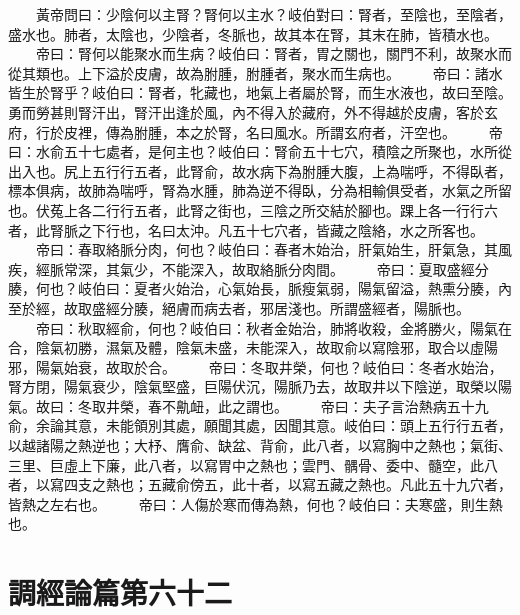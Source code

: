 　　黃帝問曰：少陰何以主腎？腎何以主水？岐伯對曰：腎者，至陰也，至陰者，盛水也。肺者，太陰也，少陰者，冬脈也，故其本在腎，其末在肺，皆積水也。
　　帝曰：腎何以能聚水而生病？岐伯曰：腎者，胃之關也，關門不利，故聚水而從其類也。上下溢於皮膚，故為胕腫，胕腫者，聚水而生病也。
　　帝曰：諸水皆生於腎乎？岐伯曰：腎者，牝藏也，地氣上者屬於腎，而生水液也，故曰至陰。勇而勞甚則腎汗出，腎汗出逢於風，內不得入於藏府，外不得越於皮膚，客於玄府，行於皮裡，傳為胕腫，本之於腎，名曰風水。所謂玄府者，汗空也。
　　帝曰：水俞五十七處者，是何主也？岐伯曰：腎俞五十七穴，積陰之所聚也，水所從出入也。尻上五行行五者，此腎俞，故水病下為胕腫大腹，上為喘呼，不得臥者，標本俱病，故肺為喘呼，腎為水腫，肺為逆不得臥，分為相輸俱受者，水氣之所留也。伏菟上各二行行五者，此腎之街也，三陰之所交結於腳也。踝上各一行行六者，此腎脈之下行也，名曰太沖。凡五十七穴者，皆藏之陰絡，水之所客也。
　　帝曰：春取絡脈分肉，何也？岐伯曰：春者木始治，肝氣始生，肝氣急，其風疾，經脈常深，其氣少，不能深入，故取絡脈分肉間。
　　帝曰：夏取盛經分腠，何也？岐伯曰：夏者火始治，心氣始長，脈瘦氣弱，陽氣留溢，熱熏分腠，內至於經，故取盛經分腠，絕膚而病去者，邪居淺也。所謂盛經者，陽脈也。
　　帝曰：秋取經俞，何也？岐伯曰：秋者金始治，肺將收殺，金將勝火，陽氣在合，陰氣初勝，濕氣及體，陰氣未盛，未能深入，故取俞以寫陰邪，取合以虛陽邪，陽氣始衰，故取於合。
　　帝曰：冬取井榮，何也？岐伯曰：冬者水始治，腎方閉，陽氣衰少，陰氣堅盛，巨陽伏沉，陽脈乃去，故取井以下陰逆，取榮以陽氣。故曰：冬取井榮，春不鼽衄，此之謂也。
　　帝曰：夫子言治熱病五十九俞，余論其意，未能領別其處，願聞其處，因聞其意。岐伯曰：頭上五行行五者，以越諸陽之熱逆也；大杼、膺俞、缺盆、背俞，此八者，以寫胸中之熱也；氣街、三里、巨虛上下廉，此八者，以寫胃中之熱也；雲門、髃骨、委中、髓空，此八者，以寫四支之熱也；五藏俞傍五，此十者，以寫五藏之熱也。凡此五十九穴者，皆熱之左右也。
　　帝曰：人傷於寒而傳為熱，何也？岐伯曰：夫寒盛，則生熱也。

\section{調經論篇第六十二}

